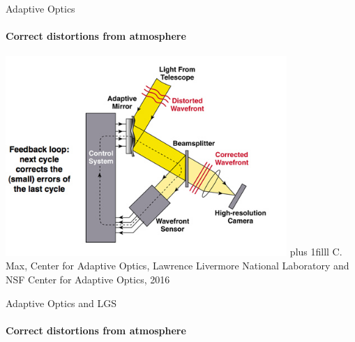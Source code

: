 \documentclass{beamer}
\newcommand{\btVFill}{\vskip0pt plus 1filll}
\begin{document}
\begin{frame}{Adaptive Optics}
  \framesubtitle{Correct distortions from atmosphere}
		\vspace{-.3cm}
		\center
		\includegraphics[width=0.8\textwidth]{Images/AOfigure.jpg}
		\btVFill
	\vspace{-.1cm}
		{\tiny C. Max, Center for Adaptive Optics, Lawrence Livermore National Laboratory and NSF Center for Adaptive Optics, 2016}
\end{frame}


\begin{frame}{Adaptive Optics and LGS}
  \framesubtitle{Correct distortions from atmosphere}
  \center
  \vspace{-1.6cm}
\end{frame}
\end{document}
